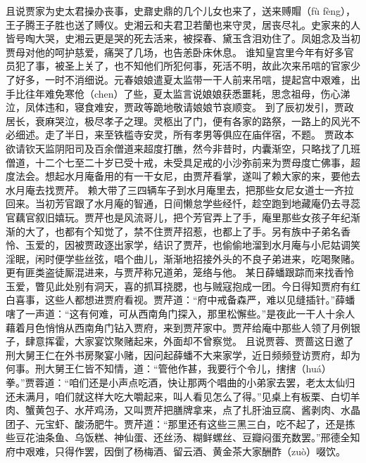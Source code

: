 \documentclass[12pt,oneside]{book}
\begin{document}
且说贾家为史太君操办丧事，史鼐史鼎的几个儿女也来了，送来赙賵（fù fèng），王子腾王子胜也送了赙仪。史湘云和夫君卫若蘭也来守灵，居丧尽礼。史家来的人皆号啕大哭，史湘云更是哭的死去活来，被探春、黛玉含泪劝住了。凤姐念及当初贾母对他的呵护慈爱，痛哭了几场，也告恙卧床休息。
谁知皇宫里今年有好多官员犯了事，被圣上关了，也不知他们所犯何事，死活不明，故此次来吊唁的官家少了好多，一时不消细说。元春娘娘遣夏太监带一干人前来吊唁，提起宫中艰难，出手比往年难免寒伧（chen）了些，夏太监言说娘娘获悉噩耗，思念祖母，伤心涕泣，凤体违和，寝食难安，贾政等跪地敬请娘娘节哀顺变。
到了辰初发引，贾政居长，衰麻哭泣，极尽孝子之理。灵柩出了门，便有各家的路祭，一路上的风光不必细述。走了半日，来至铁槛寺安灵，所有孝男等俱应在庙伴宿，不题。
贾政本欲请钦天监阴阳司及百余僧道来超度打醮，然今非昔时，内囊渐空，只略找了几班僧道，十二个七至二十岁已受十戒，未受具足戒的小沙弥前来为贾母度亡佛事，超度法会。想起水月庵备用的有一干女尼，由贾芹看掌，遂叫了赖大家的来，要他去水月庵去找贾芹。
赖大带了三四辆车子到水月庵里去，把那些女尼女道士一齐拉回来。当初芳官跟了水月庵的智通，日间懒怠学些经忏，趁空跑到地藏庵仍去寻蕊官藕官叙旧嬉玩。贾芹也是风流哥儿，把个芳官弄上了手，庵里那些女孩子年纪渐渐的大了，也都有个知觉了，禁不住贾芹招惹，也都上了手。另有族中子弟名香怜、玉爱的，因被贾政逐出家学，结识了贾芹，也偷偷地溜到水月庵与小尼姑调笑淫眠，闲时便学些丝弦，唱个曲儿，渐渐地招接外头的不良子弟进来，吃喝聚赌。更有匪类盗徒厮混进来，与贾芹称兄道弟，笼络与他。
某日薛蟠跟踪而来找香怜玉爱，瞥见此处别有洞天，喜的抓耳挠腮，也与贼寇抱成一团。今日得知贾府有红白喜事，这些人都想进贾府看视。贾芹道：“府中戒备森严，难以见缝插针。”薛蟠嗐了一声道：“这有何难，可从西南角门探入，那里松懈些。”是夜此一干人十余人藉着月色悄悄从西南角门钻入贾府，来到贾芹家中。贾芹给庵中那些人领了月例银子，肆意挥霍，大家宴饮聚赌起来，外面却不曾察觉。
且说贾蓉、贾蔷这日邀了刑大舅王仁在外书房聚宴小赌，因问起薛蟠不大来家学，近日频频登访贾府，却为何事。刑大舅王仁皆不知情，道：“管他作甚，我要行个令儿，搳搳（huá）拳。”贾蓉道：“咱们还是小声点吃酒，快让那两个唱曲的小弟家去罢，老太太仙归还未满月，咱们就这样大吃大嚼起来，叫人看见怎么了得。”见桌上有板栗、白切羊肉、蟹黄包子、水芹鸡汤，又叫贾芹把膳牌拿来，点了扎肝油豆腐、酱剥肉、水晶团子、元宝虾、酸汤肥牛。贾芹道：“那里还有这些三黑三白，吃不起了，还是拣些豆花油条鱼、乌饭糕、神仙蛋、还丝汤、糊鲜螺丝、豆瓣闷蛋充数罢。”邢德全知府中艰难，只得作罢，因倒了杨梅酒、留云酒、黄金茶大家酬酢（zuò）啜饮。
\end{document}
